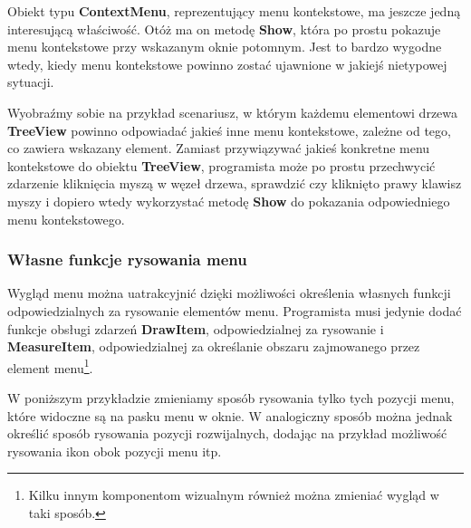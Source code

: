 Obiekt typu {\bf ContextMenu}, reprezentujący menu kontekstowe, ma jeszcze jedną interesującą
właściwość. Otóż ma on metodę {\bf Show}, która po prostu pokazuje menu kontekstowe przy
wskazanym oknie potomnym. Jest to bardzo wygodne wtedy, kiedy menu kontekstowe powinno zostać
ujawnione w jakiejś nietypowej sytuacji. 

Wyobraźmy sobie na przykład scenariusz, w którym każdemu elementowi drzewa {\bf TreeView} powinno odpowiadać
jakieś inne menu kontekstowe, zależne od tego, co zawiera wskazany element. Zamiast przywiązywać jakieś
konkretne menu kontekstowe do obiektu {\bf TreeView}, programista może po prostu przechwycić 
zdarzenie kliknięcia myszą w węzeł drzewa, sprawdzić czy kliknięto prawy klawisz myszy i dopiero
wtedy wykorzystać metodę {\bf Show} do pokazania odpowiedniego menu kontekstowego.

\subsubsection{Własne funkcje rysowania menu}

Wygląd menu można uatrakcyjnić dzięki możliwości określenia własnych funkcji odpowiedzialnych
za rysowanie elementów menu. Programista musi jedynie dodać funkcje obsługi zdarzeń {\bf DrawItem}, 
odpowiedzialnej za rysowanie i {\bf MeasureItem}, odpowiedzialnej za określanie obszaru zajmowanego przez
element menu\footnote{Kilku innym komponentom wizualnym również można zmieniać wygląd w taki sposób.}.

W poniższym przykładzie zmieniamy sposób rysowania tylko tych pozycji menu, które widoczne są
na pasku menu w oknie. W analogiczny sposób można jednak określić sposób rysowania pozycji rozwijalnych,
dodając na przykład możliwość rysowania ikon obok pozycji menu itp.

